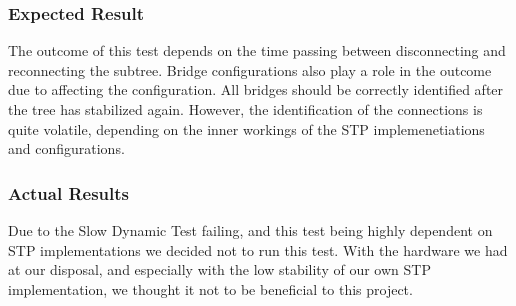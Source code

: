 \subsubsection*{Expected Result}
The outcome of this test depends on the time passing between disconnecting and reconnecting the subtree.
Bridge configurations also play a role in the outcome due to affecting the configuration.
All bridges should be correctly identified after the tree has stabilized again.
However, the identification of the connections is quite volatile, depending on the inner workings of the STP implemenetiations and configurations.

\subsubsection*{Actual Results}
Due to the Slow Dynamic Test failing, and this test being highly dependent on STP implementations we decided not to run this test.
With the hardware we had at our disposal, and especially with the low stability of our own STP implementation, we thought it not to be beneficial to this project.
